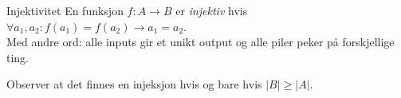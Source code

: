 \begin{frame}{Injektivitet}
En funksjon $f : A \rightarrow B$ er \emph{injektiv} hvis $\forall a_1, a_2 : f(a_1) = f(a_2) \rightarrow a_1 = a_2$.\\
Med andre ord: alle inputs gir et unikt output og alle piler peker på forskjellige ting.
    \begin{figure}%
        \pause
        \centering
        \pause
        \qquad
        \pause
        \qquad
        \label{fig:inj}%
    \end{figure}
    \pause
    Observer at det finnes en injeksjon hvis og bare hvis $|B| \geq |A|$.
\end{frame}

